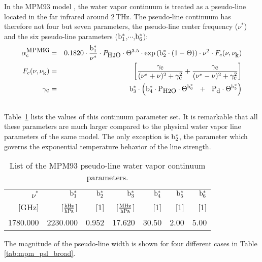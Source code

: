 \label{leveld:mpm93:contabs}
In the MPM93 model \citep{liebeetal:93}, the water 
vapor continuum is treated as a pseudo-line located in the far infrared 
around 2\,THz. The pseudo-line continuum has therefore not four but seven 
parameters, the pseudo-line center frequency ($\nu^*$) and the six 
pseudo-line parameters ($\rm b^*_{\rm 1}$,$\cdots$,$\rm b^*_{\rm 6}$):
%
\begin{eqnarray}
  \label{eq:mpm93:contabs}
  \alphampmnc & = & 0.1820 \cdot \frac{\beks}{\nu^*} \cdot \phzo \cdot 
                \Theta^{3.5} \cdot \exp{\left(\bzks\cdot(1-\Theta)\right)} \cdot 
                \nu^2 \cdot \shapec\\
%
  \label{eq:mpm93:contabs1}
   \shapec & = & \left[\frac{\gamc}{(\nu^*+\nu)^2+\gamc^2} + 
                       \frac{\gamc}{(\nu^*-\nu)^2+\gamc^2}\right]\\
%
  \label{eq:mpm93:contabs2}
  \gamc & = &  \bdks \cdot 
        \left(\bvks \cdot \phzo \cdot \Theta^{\bsks}~~+~~ 
                          \pda  \cdot \Theta^{\bfks}\right)\\
  \nonumber
\end{eqnarray}
%
Table~\ref{tab:mpm93_cont_param} lists the values of this continuum 
parameter set. It is remarkable that all these parameters are much 
larger compared to the physical water vapor line parameters of the 
same model. The only exception is $\rm b^*_{\rm 2}$, the parameter 
which governs the exponential temperature behavior of the line strength. 
%
\begin{table}[!hbt]
  \begin{center}
  \begin{tabular}{rrrrrrr}
   \hline
   $\nu^*$ & $\rm b^*_{\rm 1}$ & $\rm b^*_{\rm 2}$ & $\rm b^*_{\rm 3}$ & $\rm b^*_{\rm 4}$ & $\rm b^*_{\rm 5}$ & $\rm b^*_{\rm 6}$\\
   {\rm [GHz]}  & {[$\frac{\rm kHz}{\rm hPa}$]} & {\rm [1]} & 
   {[$\frac{\rm MHz}{\rm hPa}$]} & {\rm [1]} & {\rm [1]} & {\rm [1]} \\
    \hline
   1780.000 & 2230.000 & 0.952 & 17.620 & 30.50 & 2.00 & 5.00 \\
   \hline
  \end{tabular}
  \end{center}
  \caption{List of the MPM93 pseudo-line water vapor continuum parameters.}
  \label{tab:mpm93_cont_param}
\end{table}
%
The magnitude of the pseudo-line width is shown for four different 
cases in Table\,\ref{tab:mpm_psl_broad}. 
%
